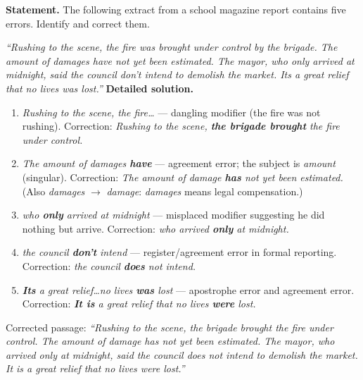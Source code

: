 \documentclass[11pt]{article}
\begin{document}
\begin{exoresolu}
\textbf{Statement.} The following extract from a school magazine report contains five errors. Identify and correct them.\par
\emph{``Rushing to the scene, the fire was brought under control by the brigade. The amount of damages have not yet been estimated. The mayor, who only arrived at midnight, said the council don't intend to demolish the market. Its a great relief that no lives was lost.''}
\tcblower
\textbf{Detailed solution.}
\begin{enumerate}
\item \emph{Rushing to the scene, the fire\ldots} — dangling modifier (the fire was not rushing). Correction: \emph{Rushing to the scene, \textbf{the brigade brought} the fire under control.}
\item \emph{The amount of damages \textbf{have}} — agreement error; the subject is \emph{amount} (singular). Correction: \emph{The amount of damage \textbf{has} not yet been estimated.} (Also \emph{damages} $\rightarrow$ \emph{damage}: \emph{damages} means legal compensation.)
\item \emph{who \textbf{only} arrived at midnight} — misplaced modifier suggesting he did nothing but arrive. Correction: \emph{who arrived \textbf{only} at midnight.}
\item \emph{the council \textbf{don't} intend} — register/agreement error in formal reporting. Correction: \emph{the council \textbf{does} not intend.}
\item \emph{\textbf{Its} a great relief\ldots no lives \textbf{was} lost} — apostrophe error and agreement error. Correction: \emph{\textbf{It is} a great relief that no lives \textbf{were} lost.}
\end{enumerate}
Corrected passage: \emph{``Rushing to the scene, the brigade brought the fire under control. The amount of damage has not yet been estimated. The mayor, who arrived only at midnight, said the council does not intend to demolish the market. It is a great relief that no lives were lost.''}
\end{exoresolu}
\end{document}
